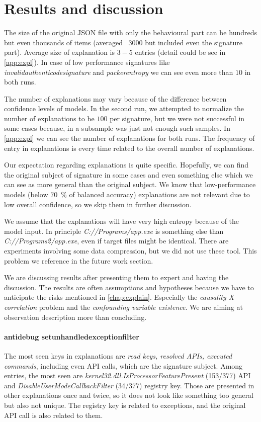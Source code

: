 
\section{Results and discussion}
The size of the original JSON file with only the behavioural part can be hundreds but even thousands of items (averaged \texttildelow~$3000$ but included even the signature part). Average size of explanation is $3-5$ entries (detail could be see in \ref{app:expl}). In case of low performance signatures like \emph{invalidauthenticodesignature} and \emph{packerentropy} we can see even more than $10$ in both runs.

The number of explanations may vary because of the difference between confidence levels of models. In the second run, we attempted to normalize the number of explanations to be $100$ per signature, but we were not successful in some cases because, in a subsample was just not enough such samples.  In \ref{app:expl} we can see the number of explanations for both runs. The frequency of entry in explanations is every time related to the overall number of explanations.

Our expectation regarding explanations is quite specific. Hopefully, we can find the original subject of signature in some cases and even something else which we can see as more general than the original subject. We know that low-performance models (below $70$~\% of balanced accuracy) explanations are not relevant due to low overall confidence, so we skip them in further discussion.

We assume that the explanations will have very high entropy because of the model input. In principle \emph{C://Programs/app.exe} is something else than \emph{C://Programs2/app.exe}, even if target files might be identical. There are experiments involving some data compression, but we did not use these tool. This problem we reference in the future work section. 

We are discussing results after presenting them to expert and having the discussion. The results are often assumptions and hypotheses because we have to anticipate the risks mentioned in \ref{chap:explain}. Especially the \emph{causality X correlation} problem and the \emph{confounding variable existence}. We are aiming at observation description more than concluding.

\paragraph{antidebug setunhandledexceptionfilter}
The most seen keys in explanations are \emph{read keys, resolved APIs, executed commands}, including even API calls, which are the signature subject. Among entries, the most seen are \emph{kernel32.dll.IsProcessorFeaturePresent} (153/377) API and \emph{DisableUserModeCallbackFilter} (34/377) registry key. Those are presented in other explanations once and twice, so it does not look like something too general but also not unique. The registry key is related to exceptions, and the original API call is also related to them.

